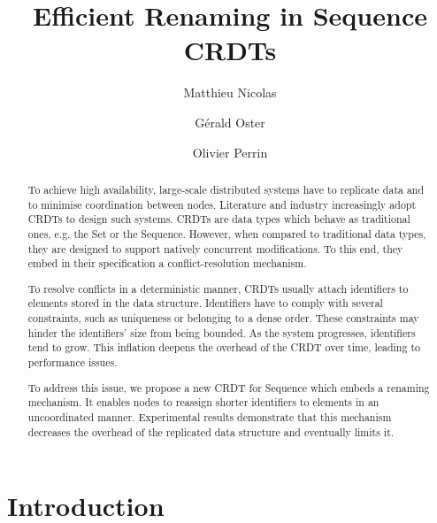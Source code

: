 \documentclass[sigplan,10pt]{acmart}
\begin{document}
\title{Efficient Renaming in Sequence \aclp{CRDT}}

\author{Matthieu Nicolas}

\author{Gérald Oster}

\author{Olivier Perrin}

\begin{abstract}
To achieve high availability, large-scale distributed systems have to replicate data and to minimise coordination between nodes.
Literature and industry increasingly adopt \acfp{CRDT} to design such systems.
\acp{CRDT} are data types which behave as traditional ones, e.g. the Set or the Sequence.
However, when compared to traditional data types, they are designed to support natively concurrent modifications.
To this end, they embed in their specification a conflict-resolution mechanism.

To resolve conflicts in a deterministic manner, CRDTs usually attach identifiers to elements stored in the data structure.
Identifiers have to comply with several constraints, such as uniqueness or belonging to a dense order.
These constraints may hinder the identifiers’ size from being bounded.
As the system progresses, identifiers tend to grow.
This inflation deepens the overhead of the \ac{CRDT} over time, leading to performance issues.

To address this issue, we propose a new CRDT for Sequence which embeds a renaming mechanism.
It enables nodes to reassign shorter identifiers to elements in an uncoordinated manner.
Experimental results demonstrate that this mechanism decreases the overhead of the replicated data structure and eventually limits it.
\end{abstract}


\maketitle

\section{Introduction}
\end{document}
